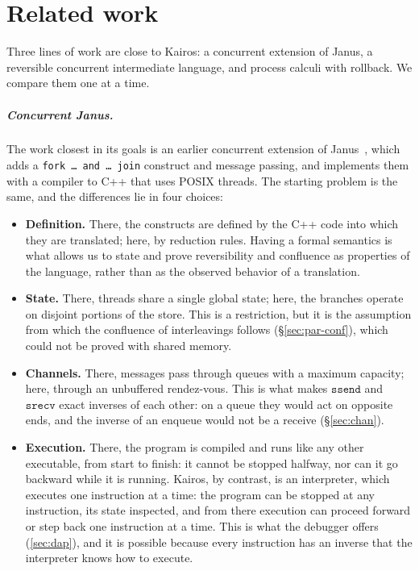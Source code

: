 \chapter{Related work}
\label{chap:correlati}
\label{sec:related}

Three lines of work are close to Kairos: a concurrent extension of Janus,
a reversible concurrent intermediate language, and process calculi with
rollback. We compare them one at a time.

\paragraph{Concurrent Janus.} The work closest in its goals is an
earlier concurrent extension of Janus~\cite{Sammarchi2019}, which adds a
\texttt{fork\,\dots\,and\,\dots\,join} construct and message passing, and
implements them with a compiler to C++ that uses POSIX threads. The starting
problem is the same, and the differences lie in four choices:

\begin{itemize}
  \item \textbf{Definition.} There, the constructs are defined by the C++ code
    into which they are translated; here, by reduction rules. Having a formal
    semantics is what allows us to state and prove reversibility and confluence
    as properties of the language, rather than as the observed behavior of a
    translation.
  \item \textbf{State.} There, threads share a single global state; here, the
    branches operate on disjoint portions of the store. This is a restriction,
    but it is the assumption from which the confluence of interleavings follows
    (\S\ref{sec:par-conf}), which could not be proved with shared memory.
  \item \textbf{Channels.} There, messages pass through queues with a maximum
    capacity; here, through an unbuffered rendez-vous. This is what makes
    $\mathtt{ssend}$ and $\mathtt{srecv}$ exact inverses of each other: on a
    queue they would act on opposite ends, and the inverse of an enqueue would
    not be a receive (\S\ref{sec:chan}).
  \item \textbf{Execution.} There, the program is compiled and runs like any
    other executable, from start to finish: it cannot be stopped halfway, nor
    can it go backward while it is running. Kairos, by contrast, is an
    interpreter, which executes one instruction at a time: the program can be
    stopped at any instruction, its state inspected, and from there execution
    can proceed forward or step back one instruction at a time. This is what
    the debugger offers (\cref{sec:dap}), and it is possible because every
    instruction has an inverse that the interpreter knows how to execute.
\end{itemize}

